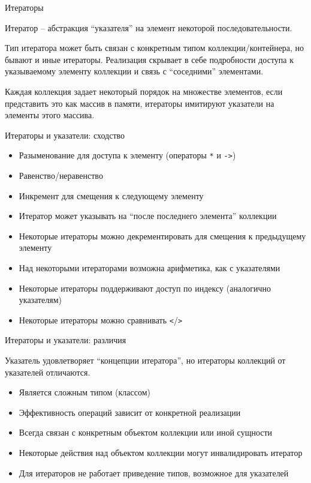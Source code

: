 \documentclass[unknownkeysallowed,xcolor=table]{beamer}
\begin{document}
\begin{frame}{Итераторы}

Итератор -- абстракция ``указателя'' на элемент некоторой последовательности.

\vspace{2em}

Тип итератора может быть связан с конкретным типом коллекции/контейнера, но бывают и иные итераторы. Реализация скрывает в себе подробности доступа к указываемому элементу коллекции и связь с ``соседними'' элементами.

\vspace{2em}

Каждая коллекция задает некоторый порядок на множестве элементов, если представить это как массив в памяти, итераторы имитируют указатели на элементы этого массива.

\end{frame}

\begin{frame}[fragile]{Итераторы и указатели: сходство}

\begin{itemize}
  \item Разыменование для доступа к элементу (операторы \lstinline{*} и \lstinline{->})
  \item Равенство/неравенство
  \item Инкремент для смещения к следующему элементу
  \item Итератор может указывать на ``после последнего элемента'' коллекции
  \item Некоторые итераторы можно декрементировать для смещения к предыдущему элементу
  \item Над некоторыми итераторами возможна арифметика, как с указателями
  \item Некоторые итераторы поддерживают доступ по индексу (аналогично указателям)
  \item Некоторые итераторы можно сравнивать \lstinline{<}/\lstinline{>}
\end{itemize}

\end{frame}

\begin{frame}{Итераторы и указатели: различия}

Указатель удовлетворяет ``концепции итератора'', но итераторы коллекций от указателей отличаются.

\vspace{1em}

\begin{itemize}
  \item Является сложным типом (классом)
  \item Эффективность операций зависит от конкретной реализации
  \item Всегда связан с конкретным объектом коллекции или иной сущности
  \item Некоторые действия над объектом коллекции могут инвалидировать итератор
  \item Для итераторов не работает приведение типов, возможное для указателей
\end{itemize}

\end{frame}
\end{document}

